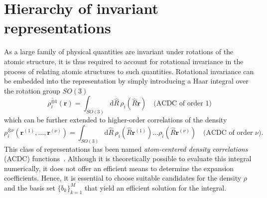 \section{Hierarchy of invariant representations}
As a large family of physical quantities are invariant under rotations of the atomic structure, it is thus required to account for rotational invariance in the process of relating atomic structures to such quantities.
Rotational invariance can be embedded into the representation by simply introducing a Haar integral over the rotation group $SO(3)$
\begin{equation}
\label{eq:integration_over_subgroup}
\overline{\rho_i^{\otimes 1}}(\mathbf{r}) = \int_{SO(3)}\mathrm{d}\hat{R}\, \rho_i(\hat{R}\mathbf{r})\quad\textrm{(ACDC of order 1)}
\end{equation}
which can be further extended to higher-order correlations of the density
\begin{equation}
\label{eq:integration_over_subgroup_higher_order}
\overline{\rho_i^{\otimes\nu}}(\mathbf{r}^{(1)},\ldots, \mathbf{r}^{(\nu)}) = \int_{SO(3)}\mathrm{d}\hat{R}\, \rho_i(\hat{R}\mathbf{r}^{(1)})\ldots\rho_i(\hat{R}\mathbf{r}^{(\nu)})\quad\textrm{(ACDC of order $\nu$)}.
\end{equation}
This class of representations has been named \emph{atom-centered density correlations} (ACDC) functions~\cite{nigam2022unified}.
Although it is theoretically possible to evaluate this integral numerically, it does not offer an efficient means to determine the expansion coefficients.
Hence, it is essential to choose suitable candidates for the density $\rho$ and the basis set $\{b_k\}_{k=1}^M$ that yield an efficient solution for the integral.

